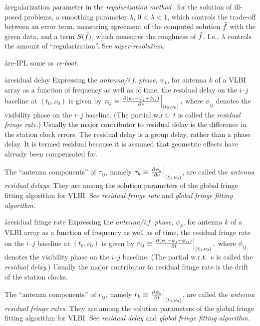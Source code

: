 \aa{regularization parameter}
in the {\it regularization method} \qv\ for the solution of ill-posed
problems, a smoothing parameter $\lambda$, $0<\lambda<1$, which controls
the trade-off between an error term, measuring agreement of the
computed solution $\tilde f$ with the given data,
and a term $S(\tilde f)$, which measures the roughness of $\tilde f$.
I.e., $\lambda$ controls the amount of ``regularization''.
See {\it super-resolution.}

\aa{re-IPL}
same as {\it re-boot}.

\aa{residual delay}
Expressing the {\it antenna/i.f. phase}, $\psi_k$,
for antenna $k$ of a VLBI array as a function of frequency
as well as of time,
the residual delay on the $i$--$j$ baseline at $(t_0,\nu_0)$
is given by
$\tau_{ij}\equiv\left.{\partial(\psi_i-\psi_j+\phi_{ij})\over
\partial\nu}\right|_{(t_0,\nu_0)},$
where $\phi_{ij}$ denotes the visibility phase on the $i$--$j$
baseline.
(The partial w.r.t.\ $t$ is called the {\it residual fringe rate}.)
Usually the major contributor to residual delay is
the difference in the station clock errors.
The residual delay is a group delay, rather than a phase delay.
It is termed residual because it is assumed that
geometric effects have already been compensated for.
\par
The ``antenna components'' of $\tau_{ij}$, namely
$\tau_k\equiv\left.{\partial\psi_k\over\partial \nu}\right|_{(t_0,\nu_0)}$,
are called the {\it antenna residual delays}.
They are among the solution parameters of the global fringe fitting
algorithm for VLBI.
See {\it residual fringe rate} and {\it global fringe fitting algorithm}.

\aa{residual fringe rate}
Expressing the {\it antenna/i.f. phase}, $\psi_k$,
for antenna $k$ of a VLBI array as a function of frequency
as well as of time,
the residual fringe rate on the $i$--$j$ baseline at $(t_0,\nu_0)$
is given by
$r_{ij}\equiv\left.{\partial(\psi_i-\psi_j+\phi_{ij})\over
\partial t}\right|_{(t_0,\nu_0)},$
where $\phi_{ij}$ denotes the visibility phase on the $i$--$j$
baseline.
(The partial w.r.t.\ $\nu$ is called the {\it residual delay}.)
Usually the major contributor to residual fringe rate is
the drift of the station clocks.
\par
The ``antenna components'' of $r_{ij}$,
namely $r_k\equiv\left.{\partial\psi_k\over\partial t}\right|_{(t_0,\nu_0)}$,
are called the {\it antenna residual fringe rates}.
They are among the solution parameters of the global fringe fitting
algorithm for VLBI.
See {\it residual delay} and {\it global fringe fitting algorithm}.

